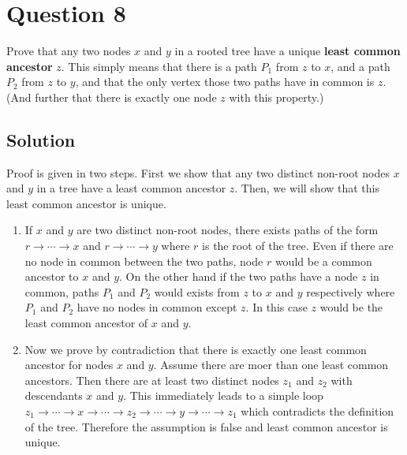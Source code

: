 
\section*{Question 8}
Prove that any two nodes $x$ and $y$ in a rooted tree have a unique \textbf{least common ancestor} $z$. This simply means that there is a path $P_1$ from $z$ to $x$, and a path $P_2$ from $z$ to $y$, and that the only vertex those two paths have in common is $z$. (And further that there is exactly one node $z$ with this property.)
\subsection*{Solution}
Proof is given in two steps. First we show that any two distinct non-root nodes $x$ and $y$ in a tree have a least common ancestor $z$. Then, we will show that this least common ancestor is unique.
\begin{enumerate}
\item[] If $x$ and $y$ are two distinct non-root nodes, there exists paths of the form $r \rightarrow \cdots \rightarrow x$ and $r \rightarrow \cdots \rightarrow y$ where $r$ is the root of the tree. Even if there are no node in common between the two paths, node $r$ would be a common ancestor to $x$ and $y$. On the other hand if the two paths have a node $z$ in common, paths $P_1$ and $P_2$ would exists from $z$ to $x$ and $y$ respectively where $P_1$ and $P_2$ have no nodes in common except $z$. In this case $z$ would be the least common ancestor of $x$ and $y$.
\item[] Now we prove by contradiction that there is exactly one least common ancestor for nodes $x$ and $y$. Assume there are moer than one least common ancestors. Then there are at least two distinct nodes $z_1$ and $z_2$ with descendants $x$ and $y$. This immediately leads to a simple loop $z_1 \rightarrow \cdots \rightarrow x \rightarrow \cdots \rightarrow z_2 \rightarrow \cdots \rightarrow y \rightarrow \cdots \rightarrow z_1$ which contradicts the definition of the tree. Therefore the assumption is false and least common ancestor is unique.
\end{enumerate}

